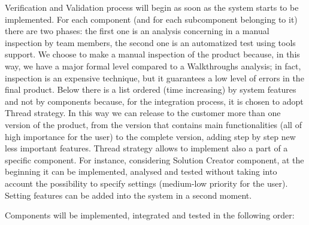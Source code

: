 \bigskip
\noindent
Verification and Validation process will begin as soon as the system starts to be implemented. For each component (and for each subcomponent belonging to it) there are two phases: the first one is an analysis concerning in a manual inspection by team members, the second one is an automatized test using tools support. We choose to make a manual inspection of the product because, in this way, we have a major formal level compared to a Walkthroughs analysis; in fact, inspection is an expensive technique, but it guarantees a low level of errors in the final product.\newline
Below there is a list ordered (time increasing) by system features and not by components because, for the integration process, it is chosen to adopt Thread strategy. In this way we can release to the customer more than one version of the product, from the version that contains main functionalities (all of high importance for the user) to the complete version, adding step by step new less important features.
Thread strategy allows to implement also a part of a specific component. For instance, considering Solution Creator component, at the beginning it can be implemented, analysed and tested without taking into account the possibility to specify settings (medium-low priority for the user). Setting features can be added into the system in a second moment.\bigskip \newline 

\noindent
Components will be implemented, integrated and tested in the following order:

